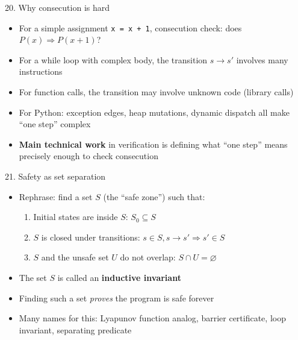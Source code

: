 \documentclass[aspectratio=169]{beamer}
\begin{document}
\begin{frame}{20. Why consecution is hard}
\begin{itemize}
  \item For a simple assignment \texttt{x = x + 1}, consecution check: does \(P(x) \Rightarrow P(x+1)\)?
  \item For a while loop with complex body, the transition \(s \to s'\) involves many instructions
  \item For function calls, the transition may involve unknown code (library calls)
  \item For Python: exception edges, heap mutations, dynamic dispatch all make ``one step'' complex
  \item \textbf{Main technical work} in verification is defining what ``one step'' means precisely enough to check consecution
\end{itemize}
\end{frame}

\begin{frame}{21. Safety as set separation}
\begin{itemize}
  \item Rephrase: find a set \(S\) (the ``safe zone'') such that:
  \begin{enumerate}
    \item Initial states are inside \(S\): \(S_0 \subseteq S\)
    \item \(S\) is closed under transitions: \(s \in S, s\to s' \Rightarrow s' \in S\)
    \item \(S\) and the unsafe set \(U\) do not overlap: \(S \cap U = \varnothing\)
  \end{enumerate}
  \item The set \(S\) is called an \textbf{inductive invariant}
  \item Finding such a set \emph{proves} the program is safe forever
  \item Many names for this: Lyapunov function analog, barrier certificate, loop invariant, separating predicate
\end{itemize}
\end{frame}
\end{document}

